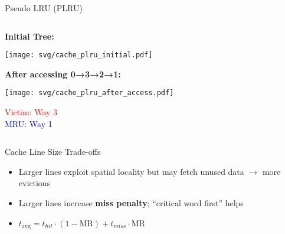 \documentclass[aspectratio=169,12pt]{beamer}
\begin{document}
\begin{frame}{Pseudo LRU (PLRU)}
\begin{columns}
\begin{column}{0.25\textwidth}
\centering
\vspace{-0.5cm}

\textbf{Initial Tree:}

\texttt{[image: svg/cache\_plru\_initial.pdf]}

\vspace{0.3cm}

\textbf{After accessing 0→3→2→1:}

\texttt{[image: svg/cache\_plru\_after\_access.pdf]}

\vspace{0.2cm}
\small
\textcolor{red}{Victim: Way 3} \\
\textcolor{blue}{MRU: Way 1}
\end{column}
\end{columns}
\end{frame}

\begin{frame}{Cache Line Size Trade-offs}
\begin{itemize}
  \item Larger lines exploit spatial locality but may fetch unused data $\rightarrow$ more evictions
  \item Larger lines increase \textbf{miss penalty}; ``critical word first'' helps
  \item $t_{\text{avg}} = t_{hit}\cdot(1-\text{MR}) + t_{miss}\cdot \text{MR}$
\end{itemize}
\end{frame}
\end{document}
